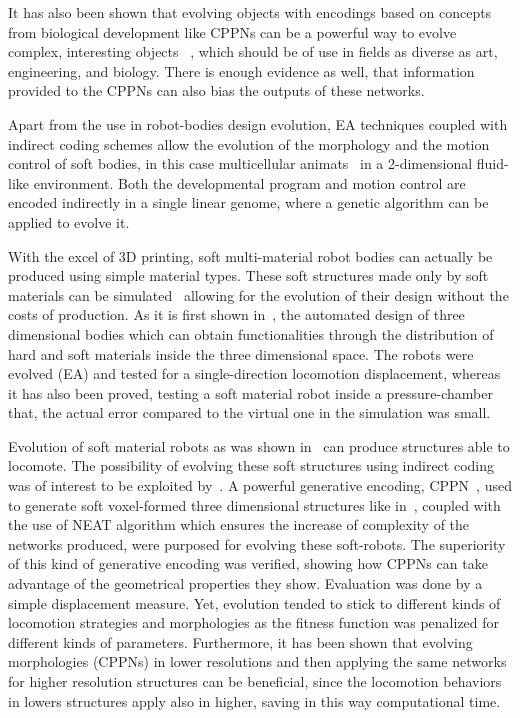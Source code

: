 It has also been shown that evolving objects with encodings based on concepts from biological development like CPPNs can be a powerful way to evolve complex, interesting objects~\cite{clune2011evolving} , which should be of use in fields as diverse as art, engineering, and biology. There is enough evidence as well, that information provided to the CPPNs can also bias the outputs of these networks.

Apart from the use in robot-bodies design evolution, EA techniques coupled with indirect coding schemes allow the evolution of the morphology and the motion control of soft bodies, in this case  multicellular animats~\cite{joachimczak2012co} in a 2-dimensional fluid-like environment. Both the developmental program and motion control are encoded indirectly in a single linear genome, where a genetic algorithm can be applied to evolve it.

With the excel of $3$D printing, soft multi-material robot bodies can actually be produced using simple material types. These soft structures made only by soft materials can be simulated~\cite{hiller2012dynamic} allowing for the evolution of their design without the costs of production. As it is first shown in~\cite{hiller2012automatic}, the automated design of three dimensional bodies which can obtain functionalities through the distribution of hard and soft materials inside the three dimensional space. The robots were evolved (EA) and tested for a single-direction locomotion displacement, whereas it has also been proved, testing a soft material robot inside a pressure-chamber that, the actual error compared to the virtual one in the simulation was small.

Evolution of soft material robots as was shown in~\cite{hiller2012automatic} can produce structures able to locomote. The possibility of evolving these soft structures using indirect coding was of interest to be exploited by~\cite{cheney2013unshackling}. A powerful generative encoding, CPPN~\cite{stanley2007compositional}, used to generate soft voxel-formed three dimensional structures like in~\cite{hiller2012automatic}, coupled with the use of NEAT algorithm which ensures the increase of complexity of the networks produced, were purposed for evolving these soft-robots. The superiority of this kind of generative encoding was verified, showing how CPPNs can take advantage of the geometrical properties they show. Evaluation was done by a simple displacement measure. Yet, evolution tended to stick to different kinds of locomotion strategies and morphologies as the fitness function was penalized for different kinds of parameters. Furthermore, it has been shown that evolving morphologies (CPPNs) in lower resolutions and then applying the same networks for higher resolution structures can be beneficial, since the locomotion behaviors in lowers structures apply also in higher, saving in this way computational time.





